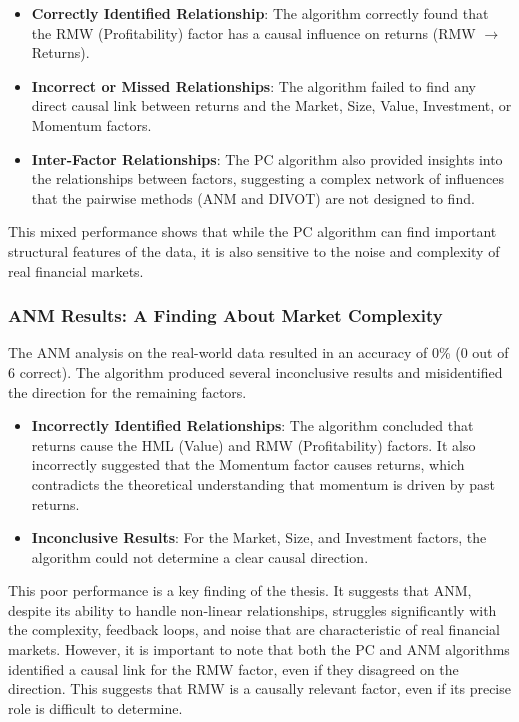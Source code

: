 \begin{itemize}
    \item \textbf{Correctly Identified Relationship}: The algorithm correctly found that the RMW (Profitability) factor has a causal influence on returns (RMW $\rightarrow$ Returns).
    
    \item \textbf{Incorrect or Missed Relationships}: The algorithm failed to find any direct causal link between returns and the Market, Size, Value, Investment, or Momentum factors.
    
    \item \textbf{Inter-Factor Relationships}: The PC algorithm also provided insights into the relationships between factors, suggesting a complex network of influences that the pairwise methods (ANM and DIVOT) are not designed to find.
\end{itemize}

This mixed performance shows that while the PC algorithm can find important structural features of the data, it is also sensitive to the noise and complexity of real financial markets.

\subsubsection{ANM Results: A Finding About Market Complexity}

The ANM analysis on the real-world data resulted in an accuracy of 0\% (0 out of 6 correct). The algorithm produced several inconclusive results and misidentified the direction for the remaining factors.

\begin{itemize}
    \item \textbf{Incorrectly Identified Relationships}: The algorithm concluded that returns cause the HML (Value) and RMW (Profitability) factors. It also incorrectly suggested that the Momentum factor causes returns, which contradicts the theoretical understanding that momentum is driven by past returns.
    \item \textbf{Inconclusive Results}: For the Market, Size, and Investment factors, the algorithm could not determine a clear causal direction.
\end{itemize}

This poor performance is a key finding of the thesis. It suggests that ANM, despite its ability to handle non-linear relationships, struggles significantly with the complexity, feedback loops, and noise that are characteristic of real financial markets. However, it is important to note that both the PC and ANM algorithms identified a causal link for the RMW factor, even if they disagreed on the direction. This suggests that RMW is a causally relevant factor, even if its precise role is difficult to determine.

